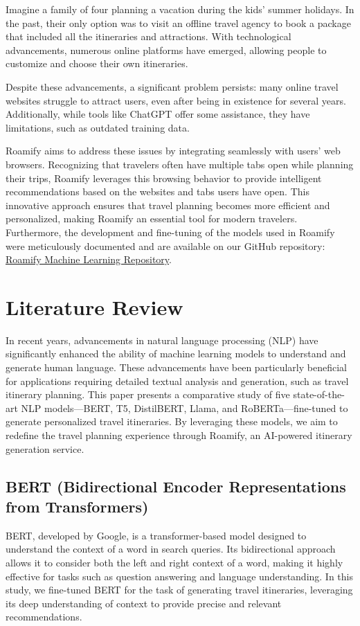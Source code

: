 \documentclass[conference]{IEEEtran}
\begin{document}
Imagine a family of four planning a vacation during the kids' summer holidays. In the past, their only option was to visit an offline travel agency to book a package that included all the itineraries and attractions. With technological advancements, numerous online platforms have emerged, allowing people to customize and choose their own itineraries.

Despite these advancements, a significant problem persists: many online travel websites struggle to attract users, even after being in existence for several years. Additionally, while tools like ChatGPT offer some assistance, they have limitations, such as outdated training data.

Roamify aims to address these issues by integrating seamlessly with users' web browsers. Recognizing that travelers often have multiple tabs open while planning their trips, Roamify leverages this browsing behavior to provide intelligent recommendations based on the websites and tabs users have open. This innovative approach ensures that travel planning becomes more efficient and personalized, making Roamify an essential tool for modern travelers.
Furthermore, the development and fine-tuning of the models used in Roamify were meticulously documented and are available on our GitHub repository: \href{https://github.com/RoamifyRedefined/Machine-Learning}{Roamify Machine Learning Repository}.

\section{Literature Review}

In recent years, advancements in natural language processing (NLP) have significantly enhanced the ability of machine learning models to understand and generate human language. These advancements have been particularly beneficial for applications requiring detailed textual analysis and generation, such as travel itinerary planning. This paper presents a comparative study of five state-of-the-art NLP models—BERT, T5, DistilBERT, Llama, and RoBERTa—fine-tuned to generate personalized travel itineraries. By leveraging these models, we aim to redefine the travel planning experience through Roamify, an AI-powered itinerary generation service.

\subsection{BERT (Bidirectional Encoder Representations from Transformers)}
BERT, developed by Google, is a transformer-based model designed to understand the context of a word in search queries. Its bidirectional approach allows it to consider both the left and right context of a word, making it highly effective for tasks such as question answering and language understanding. In this study, we fine-tuned BERT for the task of generating travel itineraries, leveraging its deep understanding of context to provide precise and relevant recommendations.
\end{document}
